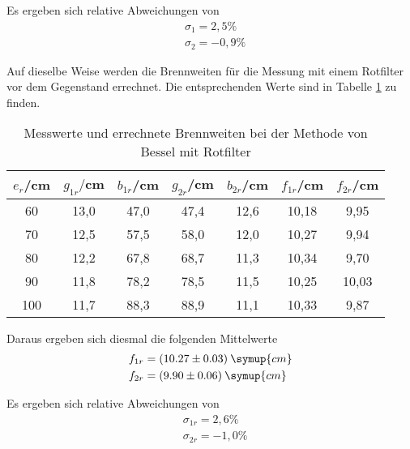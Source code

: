 Es ergeben sich relative Abweichungen von
\begin{align*}
  &\sigma_1 = 2,5 \% \\
  &\sigma_2 = -0,9 \%
\end{align*}

Auf dieselbe Weise werden die Brennweiten für die Messung mit einem Rotfilter vor dem Gegenstand errechnet. Die
entsprechenden Werte sind in Tabelle \ref{tab:besselrot} zu finden.
\begin{table}[H]
  \centering
  \caption{Messwerte und errechnete Brennweiten bei der Methode von Bessel mit Rotfilter}
  \label{tab:besselrot}
  \begin{tabular}{c c c c c c c}
    \toprule
    $e_r$/cm  & $g_{1r}/$cm & $b_{1r}$/cm & $g_{2r}$/cm & $b_{2r}$/cm & $f_{1r}$/cm & $f_{2r}$/cm \\
    \midrule
    60  &   13,0 &  47,0  &  47,4  &  12,6 & 10,18 & 9,95  \\
    70   &  12,5 &  57,5  &  58,0  &  12,0 & 10,27 & 9,94 \\
    80   &  12,2 &  67,8  &  68,7  &  11,3 & 10,34 & 9,70 \\
    90   &  11,8 &  78,2  &  78,5  &  11,5 & 10,25 & 10,03 \\
    100  &  11,7 &  88,3  &  88,9  &  11,1 & 10,33 & 9,87 \\
    \bottomrule
  \end{tabular}
\end{table}

Daraus ergeben sich diesmal die folgenden Mittelwerte
\begin{align*}
  &f_{1r} = (10.27 \pm 0.03) \: \symup{cm} \\
  &f_{2r} = (9.90 \pm 0.06) \: \symup{cm}
\end{align*}

Es ergeben sich relative Abweichungen von
\begin{align*}
  &\sigma_{1r} = 2,6 \% \\
  &\sigma_{2r} = -1,0 \%
\end{align*}

